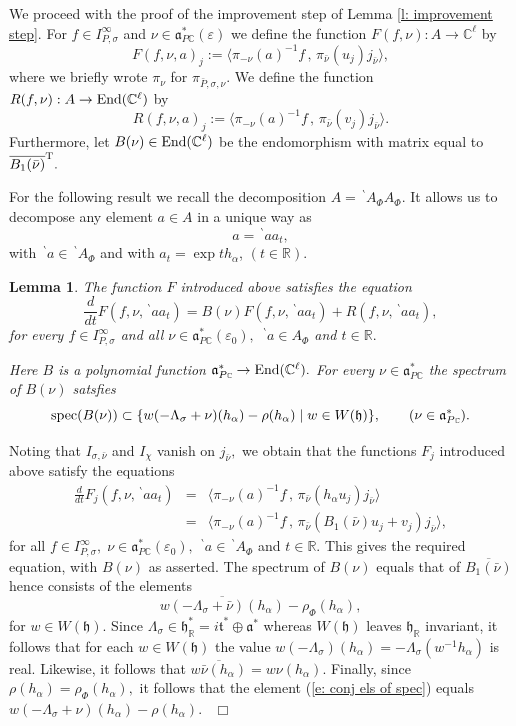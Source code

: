 \documentclass[12pt,a4paper]{article}
\newtheorem{Lemma}[Thm]{Lemma}
\newenvironment{lemma}[0]{\begin{Lemma}\noindent}%
{\end{Lemma}}
\def\proof{\par\noindent{\it Proof.}{\ }{\ }}
\def\qed{~\hfill\hbox{$\Box$}\medbreak}
\def\qquad{\quad\quad}
\def\msy#1{{\mathbb #1}}
\def\C{{\msy C}}
\def\R{{\msy R}}
\def\ga{\alpha}
\def\ge{\varepsilon}
\def\gs{\sigma}
\def\got#1{\mathfrak #1}
\def\fa{{\got a}}
\def\fh{{\got h}}
\def\ft{{\got t}}
\def\to{\rightarrow}
\def\inp#1#2{\langle#1\,,\,#2\rangle}
\def\End{{\rm End}}
\def\iC{{\scriptscriptstyle \C}}
\numberwithin{Thm}{section}
\numberwithin{equation}{section}
\def\faPdc{{\fa_{P\iC}^*}}
\def\gL{\Lambda}
\numberwithin{equation}{section}
\def\gL{\Lambda}
\def\ft{\mathfrak t}
\def\bp{\!{\,}^\backprime}
\def\spec{{\rm spec}}
\def\faPdc{\fa_{P\iC}^*}
\def\fh{{\mathfrak h}}
\def\IPgs{I_{P,\gs}^\infty}
\def\spec{{\rm spec}}
\def\cchi{\chi}
\begin{document}
We proceed with the proof of the improvement step of Lemma \ref{l: improvement step}.
For $f \in \IPgs$ and $\nu \in \faPdc(\ge)$ we define
the function $F(f, \nu) : A \to \C^\ell$ by 
$$ 
F(f, \nu, a)_j := \inp{ \pi_{-\nu}(a)^{-1} f}{ \pi_{\bar\nu}(u_j) j_{\bar\nu}},
$$
where we briefly wrote $\pi_\nu$ for $\pi_{\bar P,\gs, \nu}.$  We define the function
$R(f, \nu): A \to \End(\C^\ell)$ by 
$$ 
R(f, \nu, a)_j := \inp{\pi_{-\nu}(a)^{-1}f}{\pi_{\bar \nu}(v_j)j_{\bar \nu}}.
$$ 
Furthermore, let $B(\nu) \in \End(\C^\ell)$ be the endomorphism with matrix equal to 
$\overline{B_1(\bar \nu)}^{\rm T}.$ 

For the following result we recall the decomposition $A = \bp A_\Phi A_\Phi.$ It allows us to
decompose any element $a \in A$ in a unique way as 
$$ 
a = \bp a a_t , 
$$ 
with $\bp a \in \bp A_\Phi$ and with $a_t = \exp t h_\ga$, $(t \in \R).$

\begin{lemma}
\label{l: diff eq for F}
The function $F$ introduced above satisfies the equation
$$ 
\frac{d}{dt} F(f,\nu, \bp a a_t) = B(\nu) F(f, \nu, \bp aa_t) + R(f, \nu, \bp a a_t),
$$ 
for every $f \in \IPgs$ and all $\nu \in \faPdc(\ge_0),$ $\bp a \in A_\Phi$ and  $t \in \R.$ 

Here $B$ is a polynomial function $\faPdc \to \End(\C^\ell).$ For every $\nu \in \faPdc$ the spectrum 
of $B(\nu)$ satsfies 
$$ 
\spec (B(\nu)) \subset  \{w(-\gL_\gs + \nu)(h_\ga) - \rho(h_\ga)\mid w \in W(\fh)\},\qquad (\nu \in \faPdc).
$$ 
\end{lemma}

\proof
Noting that $I_{\gs, \bar \nu}$ and $I_\cchi$ vanish on $j_{\bar \nu},$ 
we obtain that the functions $F_j$ introduced above satisfy the equations
\begin{eqnarray*} 
\frac{d}{dt} F_j (f, \nu, \bp aa_t) & = & \inp{\pi_{-\nu} (a)^{-1} f}{\pi_{\bar \nu}(h_\ga u_j) j _{\bar \nu}}
\\
&=&  \inp{\pi_{-\nu} (a)^{-1} f}{ \pi_{\bar \nu}(B_1(\bar \nu) u_j + v_j) j_{\bar \nu}} ,
\end{eqnarray*}
for all $f \in \IPgs,\; \nu \in \faPdc(\ge_0), \; \bp a\in \bp A_\Phi$ and $t \in \R.$ 
This gives the required equation, with $B(\nu)$ as asserted. The spectrum 
of $B(\nu)$ equals that of $\overline{B_1(\bar \nu)}$ hence consists of the 
elements 
\begin{equation}
\label{e: conj els of spec}
\overline{w(-\gL_\gs + \bar \nu)(h_\ga)} - \rho_\Phi(h_\ga),
\end{equation} 
for $w \in W(\fh).$ 
Since $\gL_\gs \in \fh_\R^* = i \ft^* \oplus \fa^*$ whereas $W(\fh)$ leaves $\fh_\R$ invariant,
it follows that for each $w \in W(\fh)$ the value $w(-\gL_\gs)(h_\ga)= -\gL_\gs(w^{-1}h_\ga)$ is real. Likewise, it follows that $\overline{w\bar \nu(h_\ga)} = w \nu(h_\ga).$ Finally, since $\rho(h_\ga) = \rho_\Phi(h_\ga),$ it follows that the element (\ref{e: conj els of spec}) equals 
$w(-\gL_\gs +\nu) (h_\ga) -\rho(h_\ga).$ 
\qed
\end{document}
